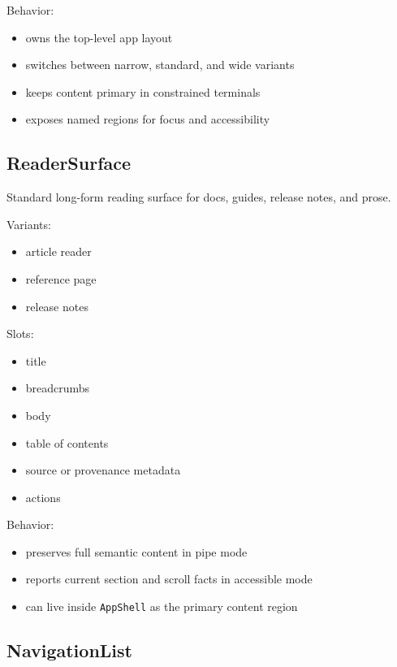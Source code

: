 Behavior:

\begin{itemize}
\tightlist
\item
  owns the top-level app layout
\item
  switches between narrow, standard, and wide variants
\item
  keeps content primary in constrained terminals
\item
  exposes named regions for focus and accessibility
\end{itemize}

\subsection{ReaderSurface}\label{record-128-readersurface}

Standard long-form reading surface for docs, guides, release notes, and prose.

Variants:

\begin{itemize}
\tightlist
\item
  article reader
\item
  reference page
\item
  release notes
\end{itemize}

Slots:

\begin{itemize}
\tightlist
\item
  title
\item
  breadcrumbs
\item
  body
\item
  table of contents
\item
  source or provenance metadata
\item
  actions
\end{itemize}

Behavior:

\begin{itemize}
\tightlist
\item
  preserves full semantic content in pipe mode
\item
  reports current section and scroll facts in accessible mode
\item
  can live inside \texttt{A\allowbreak{}p\allowbreak{}p\allowbreak{}S\allowbreak{}h\allowbreak{}e\allowbreak{}l\allowbreak{}l} as the primary content region
\end{itemize}

\subsection{NavigationList}\label{record-128-navigationlist}

